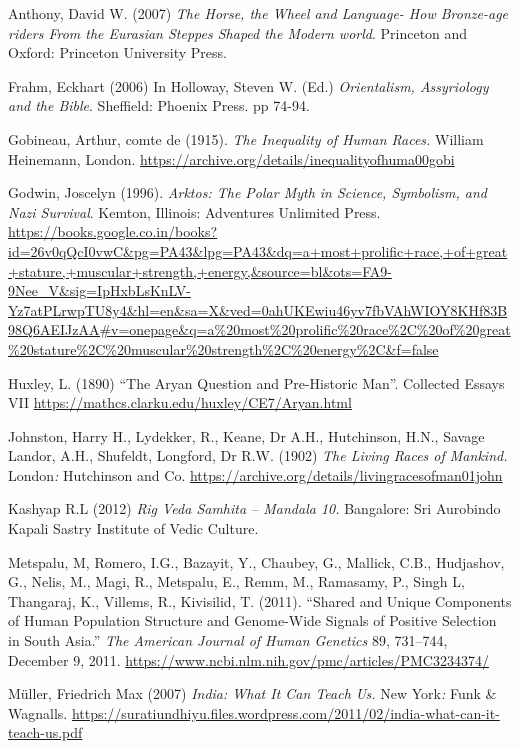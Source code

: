 \begin{thebibliography}{99}
 Anthony, David W. (2007) \textit{The Horse, the Wheel and Language- How Bronze-age riders From the Eurasian Steppes Shaped the Modern world}. Princeton and Oxford: Princeton University Press.

  Frahm, Eckhart (2006) In Holloway, Steven W. (Ed.) \textit{Orientalism, Assyriology and the Bible}. Sheffield: Phoenix Press. pp 74-94.

  Gobineau, Arthur, comte de (1915). \textit{The Inequality of Human Races. }William Heinemann, London. \url{https://archive.org/details/inequalityofhuma00gobi}

  Godwin, Joscelyn (1996). \textit{Arktos: The Polar Myth in Science, Symbolism, and Nazi Survival}. Kemton, Illinois: Adventures Unlimited Press. \url{https://books.google.co.in/books?id=26v0qQcI0vwC&pg=PA43&lpg=PA43&dq=a+most+prolific+race,+of+great+stature,+muscular+strength,+energy,&source=bl&ots=FA9-9Nee_V&sig=IpHxbLsKnLV-Yz7atPLrwpTU8y4&hl=en&sa=X&ved=0ahUKEwiu46yv7fbVAhWIOY8KHf83B98Q6AEIJzAA#v=onepage&q=a%20most%20prolific%20race%2C%20of%20great%20stature%2C%20muscular%20strength%2C%20energy%2C&f=false}

  Huxley, L. (1890) “The Aryan Question and Pre-Historic Man”. Collected Essays VII \url{https://mathcs.clarku.edu/huxley/CE7/Aryan.html}

  Johnston, Harry H., Lydekker, R., Keane, Dr A.H., Hutchinson, H.N., Savage Landor, A.H., Shufeldt, Longford, Dr R.W. (1902) \textit{The Living Races of Mankind. }London\textit{:} Hutchinson and Co. \url{ https://archive.org/details/livingracesofman01john}

  Kashyap R.L (2012) \textit{Rig Veda Samhita – Mandala 10. }Bangalore: Sri Aurobindo Kapali Sastry Institute of Vedic Culture.

  Metspalu, M, Romero, I.G., Bazayit, Y., Chaubey, G., Mallick, C.B., Hudjashov, G., Nelis, M., Magi, R., Metspalu, E., Remm, M., Ramasamy, P., Singh L, Thangaraj, K., Villems, R., Kivisilid, T. (2011). “Shared and Unique Components of Human Population Structure and Genome-Wide Signals of Positive Selection in South Asia.” \textit{The American Journal of Human Genetics} 89, 731–744, December 9, 2011. \url{https://www.ncbi.nlm.nih.gov/pmc/articles/PMC3234374/}

  Müller, Friedrich Max (2007) \textit{India: What It Can Teach Us. }New York\textit{: }Funk \& Wagnalls. \url{https://suratiundhiyu.files.wordpress.com/2011/02/india-what-can-it-teach-us.pdf}


\end{thebibliography}
